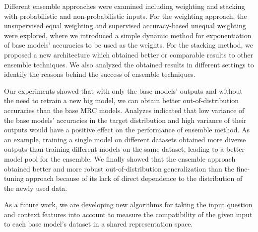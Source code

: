 \documentclass[review]{elsarticle}
\begin{document}
Different ensemble approaches were examined including weighting and stacking with probabilistic and non-probabilistic inputs. For the weighting approach, the unsupervised equal weighting and supervised accuracy-based unequal weighting were explored, where we introduced a simple dynamic method for exponentiation of base models' accuracies to be used as the weights. For the stacking method, we proposed a new architecture which obtained better or comparable results to other ensemble techniques. We also analyzed the obtained results in different settings to identify the reasons behind the success of ensemble techniques. 

Our experiments showed that with only the base models' outputs and without the need to retrain a new big model, we can obtain better out-of-distribution accuracies than the base MRC models. Analyzes indicated that low variance of the base models' accuracies in the target distribution and high variance of their outputs would have a positive effect on the performance of ensemble method. As an example, training a single model on different datasets obtained more diverse outputs than training different models on the same dataset, leading to a better model pool for the ensemble. 
We finally showed that the ensemble approach obtained better and more robust out-of-distribution generalization than the fine-tuning approach because of its lack of direct dependence to the distribution of the newly used data. 

As a future work, we are developing new algorithms for taking the input question and context features into account to measure the compatibility of the given input to each base model's dataset in a shared representation space. 


\clearpage
\appendix
\section{}

\setcounter{table}{0} 

\end{document}
